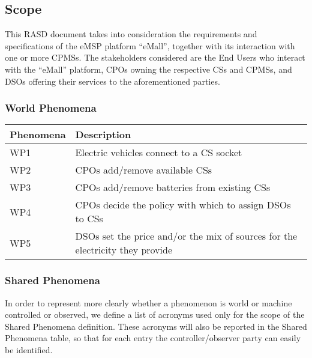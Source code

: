 \documentclass[11pt]{article}
\begin{document}
\subsection{Scope}

This RASD document takes into consideration the requirements and specifications of the eMSP platform “eMall”, together with its interaction with one or more CPMSs. The stakeholders considered are the End Users who interact with the “eMall” platform, CPOs owning the respective CSs and CPMSs, and DSOs offering their services to the aforementioned parties.

\subsubsection{World Phenomena}

\begin{table}[H]
    \centering
    \setlength{\tabcolsep}{18pt}
    \renewcommand{\arraystretch}{1.2}
    \begin{tabularx}{\textwidth}{|>{\centering\hsize=0.3\hsize}X|>{\hsize=1.7\hsize}X|}
        \hline
        \textbf{Phenomena} & \textbf{Description} \\
        \hline
        WP1 & Electric vehicles connect to a CS socket \\
        \hline
        WP2 & CPOs add/remove available CSs \\
        \hline
        WP3 & CPOs add/remove batteries from existing CSs \\
        \hline
        WP4 & CPOs decide the policy with which to assign DSOs to CSs \\
        \hline
        WP5 & DSOs set the price and/or the mix of sources for the electricity they provide \\
        \hline
    \end{tabularx}
    \label{tab:world_phenomena}
\end{table}

\subsubsection{Shared Phenomena}

In order to represent more clearly whether a phenomenon is world or machine controlled or observed, we define a list of acronyms used only for the scope of the Shared Phenomena definition. These acronyms will also be reported in the Shared Phenomena table, so that for each entry the controller/observer party can easily be identified. 
\end{document}
